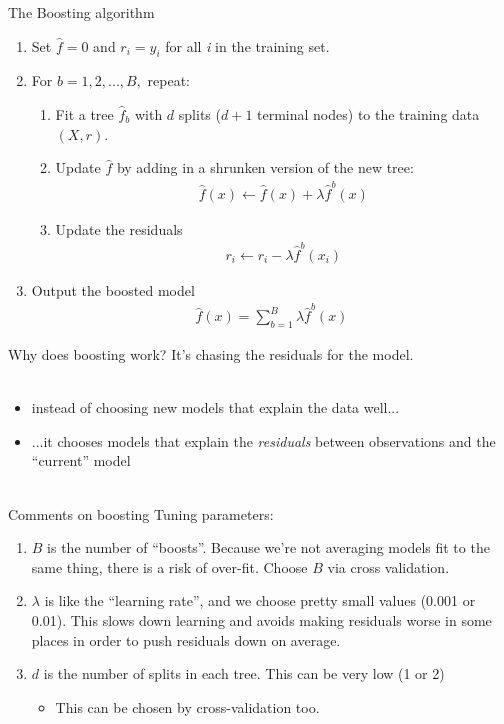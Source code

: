 \documentclass[mathserif, aspectratio=169]{beamer}
\begin{document}
\begin{frame}{The Boosting algorithm}
\begin{enumerate}
\item Set $\hat{f}=0$ and $r_i =y_i$ for all \textit{i} in the training set.
\item For $b=1,2,...,B,$ repeat:
\begin{enumerate}
\item Fit a tree $\hat{f}_b$ with $d$ splits ($d+1$ terminal nodes) to the training data $(X,r)$.
\item Update $\hat{f}$ by adding in a shrunken version of the new tree:
\begin{align*}
\hat{f}(x) \leftarrow\hat{f}(x)+\lambda \hat{f}^b(x)
\end{align*}
\item Update the residuals
\begin{align*}
r_i \leftarrow r_i - \lambda\hat{f}^b(x_i)
\end{align*}
\end{enumerate}
\item Output the boosted model
\begin{align*}
\hat{f}(x) =\sum_{b=1}^B \lambda \hat{f}^b(x)
\end{align*}
\end{enumerate}
\end{frame}

\begin{frame}{Why does boosting work?}
\pause
It's chasing the residuals for the model.\\~\\
\begin{itemize}
\item instead of choosing new models that explain the data well...
\item ...it chooses models that explain the \textit{residuals} between observations and the ``current'' model\\~\\
\end{itemize}
\end{frame}

\begin{frame}{Comments on boosting}
Tuning parameters:
\begin{enumerate}
\item $B$ is the number of ``boosts''.  Because we're not averaging models fit to the same thing, there is a risk of over-fit.  Choose $B$ via cross validation.
\item $\lambda$ is like the ``learning rate'', and we choose pretty small values (0.001 or 0.01).   This slows down learning and avoids making residuals worse in some places in order to push residuals down on average. 
\item $d$ is the number of splits in each tree.  This can be very low (1 or 2)
\begin{itemize}
	\item This can be chosen by cross-validation too.
\end{itemize}
\end{enumerate}
\end{frame}
\end{document}
